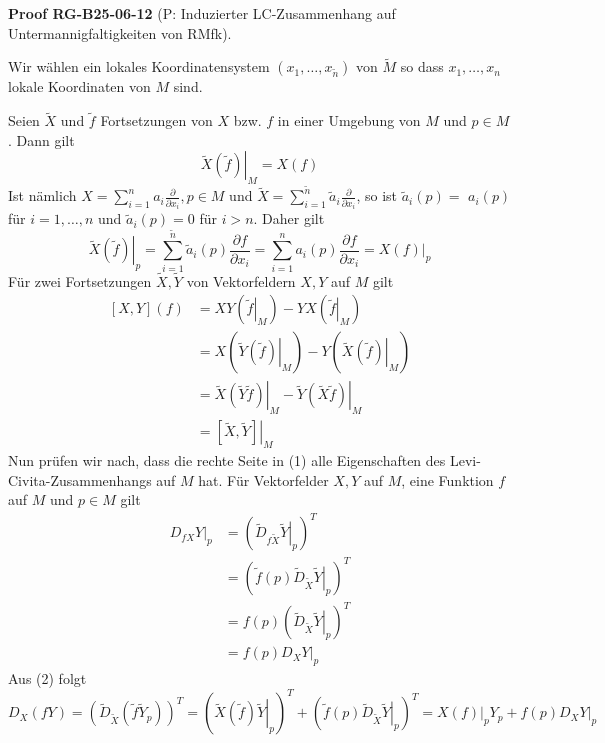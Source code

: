 \documentclass[10pt, letterpaper]{article}
\newcommand{\CustomHeading}[3]{%
  \par\medskip\noindent%
  \textbf{#1 #2} \textnormal{(#3)}.\enskip%
}
\newenvironment{PROOF}[2]{\begin{unitbox}\CustomHeading{Proof}{#1}{#2}}{\end{unitbox}}
\begin{document}
\begin{PROOF}{RG-B25-06-12}{P: Induzierter LC-Zusammenhang auf Untermannigfaltigkeiten von RMfk}
Wir wählen ein lokales Koordinatensystem $\left(x_{1}, \ldots, x_{\tilde{n}}\right)$ von $\tilde{M}$ so dass $x_{1}, \ldots, x_{n}$ lokale Koordinaten von $M$ sind.

Seien $\tilde{X}$ und $\tilde{f}$ Fortsetzungen von $X$ bzw. $f$ in einer Umgebung von $M$ und $p \in M$. Dann gilt
\begin{equation*}
\left.\tilde{X}(\tilde{f})\right|_{M}=X(f) \tag{2}
\end{equation*}
Ist nämlich $X=\sum_{i=1}^{n} a_{i} \frac{\partial}{\partial x_{i}}, p \in M$ und $\tilde{X}=\sum_{i=1}^{\tilde{n}} \tilde{a}_{i} \frac{\partial}{\partial x_{i}}$, so ist $\tilde{a}_{i}(p)=$ $a_{i}(p)$ für $i=1, \ldots, n$ und $\tilde{a}_{i}(p)=0$ für $i>n$. Daher gilt
$$
\left.\tilde{X}(\tilde{f})\right|_{p}=\sum_{i=1}^{\tilde{n}} \tilde{a}_{i}(p) \frac{\partial f}{\partial x_{i}}=\sum_{i=1}^{n} a_{i}(p) \frac{\partial f}{\partial x_{i}}=\left.X(f)\right|_{p}
$$
Für zwei Fortsetzungen $\tilde{X}, \tilde{Y}$ von Vektorfeldern $X, Y$ auf $M$ gilt
\begin{align*}
{[X, Y](f) } & =X Y\left(\left.\tilde{f}\right|_{M}\right)-Y X\left(\left.\tilde{f}\right|_{M}\right) \\
& =X\left(\left.\tilde{Y}(\tilde{f})\right|_{M}\right)-Y\left(\left.\tilde{X}(\tilde{f})\right|_{M}\right) \\
& =\left.\tilde{X}(\tilde{Y} \tilde{f})\right|_{M}-\left.\tilde{Y}(\tilde{X} \tilde{f})\right|_{M} \\
& =\left.[\tilde{X}, \tilde{Y}]\right|_{M} \tag{3}
\end{align*}
Nun prüfen wir nach, dass die rechte Seite in (1) alle Eigenschaften des Levi-Civita-Zusammenhangs auf $M$ hat. Für Vektorfelder $X, Y$ auf $M$, eine Funktion $f$ auf $M$ und $p \in M$ gilt
\[
\begin{aligned}
\left. D_{f X} Y \right|_{p} 
&= \left( \left. \tilde{D}_{f \tilde{X}} \tilde{Y} \right|_{p} \right)^T \\
&= \left( \left. \tilde{f}(p) \tilde{D}_{\tilde{X}} \tilde{Y} \right|_{p} \right)^T \\
&= f(p) \left( \left. \tilde{D}_{\tilde{X}} \tilde{Y} \right|_{p} \right)^T \\
&= \left. f(p) D_X Y \right|_{p}
\end{aligned}
\]
Aus (2) folgt
$$
D_{X}(f Y)=\left(\tilde{D}_{\tilde{X}}\left(\tilde{f} \tilde{Y}_{p}\right)\right)^{T}=\left(\left.\tilde{X}(\tilde{f}) \tilde{Y}\right|_{p}\right)^{T}+\left(\left.\tilde{f}(p) \tilde{D}_{\tilde{X}} \tilde{Y}\right|_{p}\right)^{T}=\left.X(f)\right|_{p} Y_{p}+\left.f(p) D_{X} Y\right|_{p}
$$
\end{PROOF}
\end{document}
